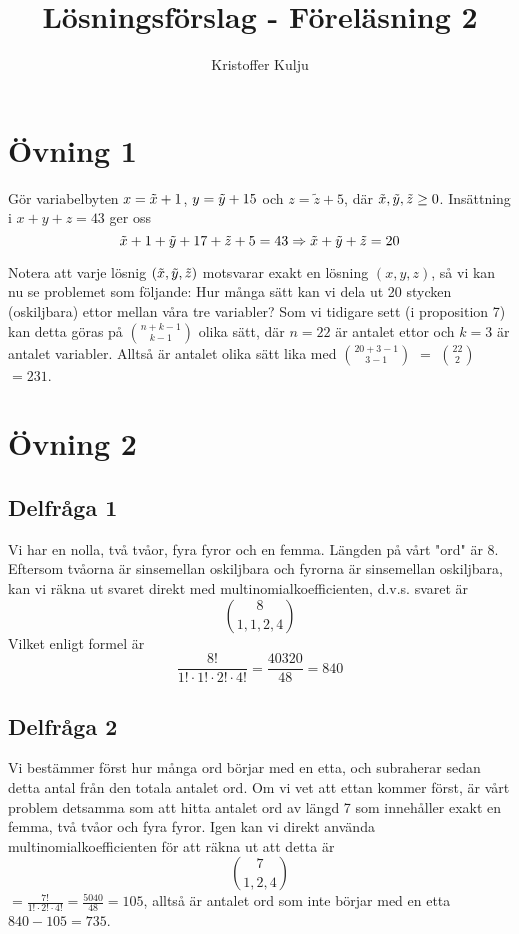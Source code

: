 \documentclass{article}
\title{Lösningsförslag - Föreläsning 2}
\author{Kristoffer Kulju}
\begin{document}
\maketitle

\section*{Övning 1}
Gör variabelbyten $x=\Tilde{x} + 1$, $y = \Tilde{y} + 15$ och $z=\tilde{z}+5$, där $\Tilde{x}, \Tilde{y}, \Tilde{z}\geq 0$. Insättning i $x+y+z=43$ ger oss $$
\Tilde{x} + 1 + \Tilde{y} + 17 + \Tilde{z} + 5 = 43 \Rightarrow  \Tilde{x} +  \Tilde{y} +  \Tilde{z}= 20
$$

Notera att varje lösnig $(\Tilde{x}, \Tilde{y}, \Tilde{z})$ motsvarar exakt en lösning $(x, y, z)$, så vi kan nu se problemet som följande: Hur många sätt kan vi dela ut 20 stycken (oskiljbara) ettor mellan våra tre variabler? Som vi tidigare sett (i proposition 7) kan detta göras på $n + k - 1 \choose k - 1$ olika sätt, där $n=22$ är antalet ettor och $k=3$ är antalet variabler. Alltså är antalet olika sätt lika med $20 + 3 - 1 \choose 3 - 1$ $=$ $22 \choose 2$ $=231$. 

\section*{Övning 2}
\subsection*{Delfråga 1}
Vi har en nolla, två tvåor, fyra fyror och en femma. Längden på vårt "ord" är 8. Eftersom tvåorna är sinsemellan oskiljbara och fyrorna är sinsemellan oskiljbara, kan vi räkna ut svaret direkt med multinomialkoefficienten, d.v.s. svaret är $$
8 \choose 1, 1, 2, 4 
$$
Vilket enligt formel är $$
\frac{8!}{1!\cdot1!\cdot2!\cdot4!} = \frac{40320}{48}=840
$$
\subsection*{Delfråga 2}
Vi bestämmer först hur många ord börjar med en etta, och subraherar sedan detta antal från den totala antalet ord. Om vi vet att ettan kommer först, är vårt problem detsamma som att hitta antalet ord av längd 7 som innehåller exakt en femma, två tvåor och fyra fyror. Igen kan vi direkt använda multinomialkoefficienten för att räkna ut att detta är $$
7 \choose 1, 2, 4
$$
$=\frac{7!}{1!\cdot 2!\cdot 4!}=\frac{5040}{48}=105$, alltså är antalet ord som inte börjar med en etta $840-105=735$. 
\end{document}
